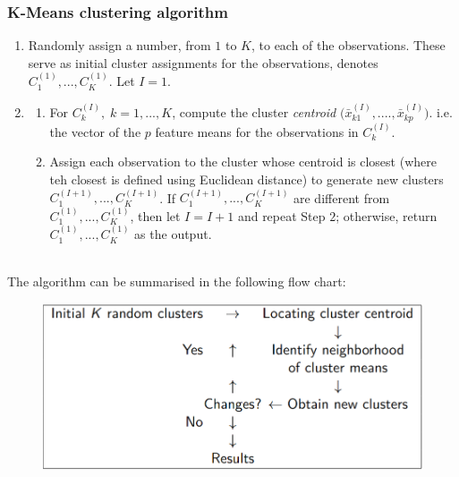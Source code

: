 \documentclass[11pt]{article}
\begin{document}
\subsubsection{K-Means clustering algorithm}
\begin{enumerate}
    \item Randomly assign a number, from $1$ to $K$, to each of the observations. These serve as initial cluster assignments for the observations, denotes $C_1^{(1)},..., C_{K}^{(1)}$. Let $I = 1$.
    \item \phantom{i}
        \begin{enumerate}
            \item For $C_{k}^{(I)}, \; k=1,...,K$, compute the cluster \textit{centroid} $\Big(\bar{x}_{k1}^{(I)}, ...., \bar{x}_{kp}^{(I)}\Big)$. i.e. the vector of the $p$ feature means for the observations in $C_{k}^{(I)}$.
            \item Assign each observation to the cluster whose centroid is closest (where teh closest is defined using Euclidean distance) to generate new clusters $C_1^{(I+1)}, ..., C_{K}^{(I+1)}$. If $C_1^{(I+1)},...,C_K^{(I+1)}$ are different from $C_1^{(1)},..., C_K^{(1)}$, then let $I = I + 1$ and repeat Step $2$; otherwise, return $C_1^{(1)},...,C_K^{(1)}$ as the output.
        \end{enumerate}
\end{enumerate} \phantom{i} \\
\noindent The algorithm can be summarised in the following flow chart:
\begin{figure}[H]
    \centering
    \includegraphics[width=0.7\linewidth]{K-means algorithm flow chart.png}
\end{figure}
\end{document}
